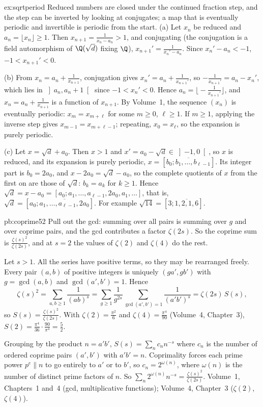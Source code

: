 \begin{solution}{ex:sqrtperiod}
\idea Reduced numbers are closed under the continued fraction step, and the step can be inverted by looking at conjugates;
a map that is eventually periodic and invertible is periodic from the start.
\writeup (a) Let $x_n$ be reduced and $a_n=\lfloor x_n\rfloor\ge1$. Then $x_{n+1}=\frac1{x_n-a_n}>1$, and conjugating (the conjugation is a field
automorphism of $\Q(\sqrt d)$ fixing $\Q$), $x_{n+1}'=\frac1{x_n'-a_n}$. Since $x_n'-a_n<-1$, $-1<x_{n+1}'<0$.

(b) From $x_n=a_n+\frac1{x_{n+1}}$, conjugation gives $x_n'=a_n+\frac1{x_{n+1}'}$, so $-\frac1{x_{n+1}'}=a_n-x_n'$, which lies in $\left]a_n,a_n+1\right[$
since $-1<x_n'<0$. Hence $a_n=\bigl\lfloor-\frac1{x_{n+1}'}\bigr\rfloor$, and $x_n=a_n+\frac1{x_{n+1}}$ is a function of $x_{n+1}$. By Volume~1, the
sequence $(x_n)$ is eventually periodic: $x_m=x_{m+\ell}$ for some $m\ge0$, $\ell\ge1$. If $m\ge1$, applying the inverse step gives
$x_{m-1}=x_{m+\ell-1}$; repeating, $x_0=x_\ell$, so the expansion is purely periodic.

(c) Let $x=\sqrt d+a_0$. Then $x>1$ and $x'=a_0-\sqrt d\in\left]-1,0\right[$, so $x$ is reduced, and its expansion is purely periodic,
$x=[\overline{b_0;b_1,\dots,b_{\ell-1}}]$. Its integer part is $b_0=2a_0$, and $x-2a_0=\sqrt d-a_0$, so the complete quotients of $x$ from
the first on are those of $\sqrt d$: $b_k=a_k$ for $k\ge1$. Hence $\sqrt d=x-a_0=[a_0;a_1,\dots,a_{\ell-1},2a_0,a_1,\dots]$, that is,
$\sqrt d=[a_0;\overline{a_1,\dots,a_{\ell-1},2a_0}]$. For example $\sqrt{14}=[3;\overline{1,2,1,6}]$.
\end{solution}

\begin{solution}{pb:coprime52}
\idea Pull out the gcd: summing over all pairs is summing over $g$ and over coprime pairs, and the gcd contributes a factor
$\zeta(2s)$. So the coprime sum is $\frac{\zeta(s)^2}{\zeta(2s)}$, and at $s=2$ the values of $\zeta(2)$ and $\zeta(4)$ do the
rest.

\writeup Let $s>1$. All the series have positive terms, so they may be rearranged freely. Every pair $(a,b)$ of positive
integers is uniquely $(ga',gb')$ with $g=\gcd(a,b)$ and $\gcd(a',b')=1$. Hence
\[
\zeta(s)^2=\sum_{a,b\ge1}\frac1{(ab)^s}=\sum_{g\ge1}\frac1{g^{2s}}\sum_{\gcd(a',b')=1}\frac1{(a'b')^s}=\zeta(2s)\,S(s),
\]
so $S(s)=\frac{\zeta(s)^2}{\zeta(2s)}$. With $\zeta(2)=\frac{\pi^2}6$ and $\zeta(4)=\frac{\pi^4}{90}$ (Volume~4, Chapter~3),
$S(2)=\frac{\pi^4}{36}\cdot\frac{90}{\pi^4}=\frac52$.

Grouping by the product $n=a'b'$, $S(s)=\sum_nc_nn^{-s}$ where $c_n$ is the number of ordered coprime pairs $(a',b')$ with
$a'b'=n$. Coprimality forces each prime power $p^e\parallel n$ to go entirely to $a'$ or to $b'$, so $c_n=2^{\omega(n)}$, where
$\omega(n)$ is the number of distinct prime factors of $n$. So $\sum_n2^{\omega(n)}n^{-s}=\frac{\zeta(s)^2}{\zeta(2s)}$.
\tools Volume~1, Chapters~1 and~4 (gcd, multiplicative functions); Volume~4, Chapter~3 ($\zeta(2)$, $\zeta(4)$).
\end{solution}

